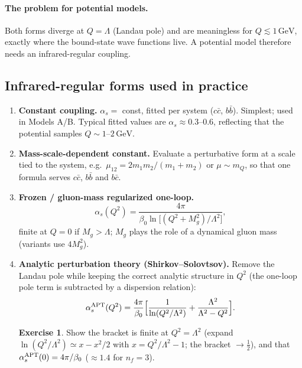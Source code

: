 \documentclass[11pt,a4paper]{article}
\numberwithin{equation}{section}
\theoremstyle{definition}
\newtheorem{exercise}[definition]{Exercise}
\theoremstyle{plain}
\theoremstyle{remark}
\numberwithin{algorithm}{section}
\newcommand{\as}{\alpha_s}
\newcommand{\GeV}{\,\mathrm{GeV}}
\begin{document}
\paragraph{The problem for potential models.} Both forms diverge at $Q=\Lambda$ (Landau pole) and are meaningless for $Q\lesssim1\GeV$, exactly where the bound-state wave functions live. A potential model therefore needs an infrared-regular coupling.

\subsection{Infrared-regular forms used in practice}
\begin{enumerate}[leftmargin=1.5em,itemsep=4pt]
\item \textbf{Constant coupling.} $\as=$ const, fitted per system ($c\bar c$, $b\bar b$). Simplest; used in Models A/B. Typical fitted values are $\as\approx0.3$--$0.6$, reflecting that the potential samples $Q\sim1$--$2\GeV$.

\item \textbf{Mass-scale-dependent constant.} Evaluate a perturbative form at a scale tied to the system, e.g.\ $\mu_{12}=2m_1m_2/(m_1+m_2)$ or $\mu\sim m_Q$, so that one formula serves $c\bar c$, $b\bar b$ and $b\bar c$.

\item \textbf{Frozen / gluon-mass regularized one-loop.}
\begin{equation}
\as(Q^2)=\frac{4\pi}{\beta_0\ln\big[(Q^2+M_g^2)/\Lambda^2\big]},
\end{equation}
finite at $Q=0$ if $M_g>\Lambda$; $M_g$ plays the role of a dynamical gluon mass (variants use $4M_g^2$).

\item \textbf{Analytic perturbation theory (Shirkov--Solovtsov).} Remove the Landau pole while keeping the correct analytic structure in $Q^2$ (the one-loop pole term is subtracted by a dispersion relation):
\begin{equation}
\as^{\rm APT}(Q^2)=\frac{4\pi}{\beta_0}\Big[\frac{1}{\ln(Q^2/\Lambda^2)}+\frac{\Lambda^2}{\Lambda^2-Q^2}\Big].
\end{equation}
\begin{exercise}
Show the bracket is finite at $Q^2=\Lambda^2$ (expand $\ln(Q^2/\Lambda^2)\simeq x-x^2/2$ with $x=Q^2/\Lambda^2-1$; the bracket $\to\frac12$), and that $\as^{\rm APT}(0)=4\pi/\beta_0$ ($\approx1.4$ for $n_f=3$).
\end{exercise}


\end{enumerate}
\end{document}
